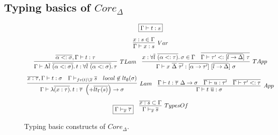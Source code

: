 \documentclass[11pt]{article}
\newcommand{\mathframebox}[1]{\framebox{$\displaystyle #1$}}
\newcommand{\ap}{~}
\begin{document}
    \subsection{Typing basics of $Core_\Delta$}

    \begin{figure}
        \begin{gather*}
            \mathframebox{\Gamma\vdash t : s} \\[0.5em]
            \infer[Var]{\Gamma\vdash x : s}{x : s \in \Gamma} \\
            \begin{array}{cc}
                \infer[TLam]{
                    \Gamma\vdash\Lambda\overline{l}\ap\overline{(\alpha <: \sigma)}\ldotp t : \forall\overline{l}\ap\overline{(\alpha <: \sigma)}\ldotp\tau
                }{
                    \overline{\alpha <: \sigma}, \Gamma\vdash t : \tau
                } &
                \infer[TApp]{
                    \Gamma\vdash x\ap\overline{\Delta}\ap\overline{\tau'} : [\overline{\alpha\to\tau'}]\ap[\overline{l\to\Delta}]\ap\sigma
                }{
                    x : \forall\overline{l}\ap\overline{(\alpha <: \tau)}\ldotp \sigma \in \Gamma
                    &
                    \overline{\Gamma\vdash\tau' <: [\overline{l\to\Delta}]\ap\tau}
                }
            \end{array} \\[0.5em]
            \begin{array}{cc}
                \infer[Lam]{
                    \Gamma\vdash \lambda \overline{(x : \tau)} \ldotp t :  \overline{\tau}~ \left(+\overline{lt_\Gamma(s)}\right) \to \sigma
                }{
                    \overline{x : \tau}, \Gamma\vdash t : \sigma
                    &
                    \Gamma\vdash_{fv(t)\setminus \overline{x}}\overline{s}
                    &
                    local \not\in lt_\emptyset(\sigma)
                } &
                \infer[App]{
                    \Gamma\vdash t \ap \overline{u} : \sigma
                } {
                    \Gamma\vdash t : \overline{\tau}~\Delta\to\sigma
                    &
                    \overline{\Gamma\vdash u : \tau'}
                    &
                    \overline{\Gamma\vdash\tau' <: \tau}
                }
            \end{array} \\[0.5em]
            \begin{array}{cc}
                \mathframebox{\Gamma\vdash_{\overline{x}}\overline{\tau}} &
                \infer[TypesOf]{\Gamma\vdash_{\overline{x}}\overline{s}}{\overline{x : s} \subset \Gamma}
            \end{array}
        \end{gather*}
        \caption{Typing basic constructs of $Core_\Delta$.}
        \label{fig:core-functions}
    \end{figure}
\end{document}
